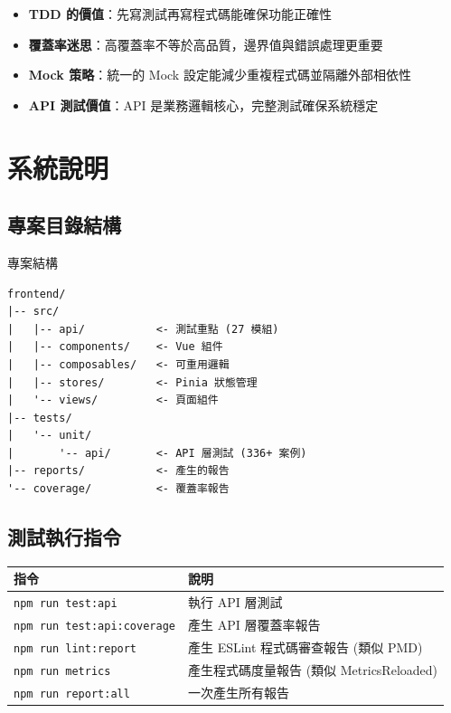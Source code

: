 \documentclass[11pt, a4paper]{article}
\begin{document}
\begin{itemize}[label=\textcolor{ElectricCyan}{$\blacksquare$}]
  \item \textbf{TDD 的價值}：先寫測試再寫程式碼能確保功能正確性
  \item \textbf{覆蓋率迷思}：高覆蓋率不等於高品質，邊界值與錯誤處理更重要
  \item \textbf{Mock 策略}：統一的 Mock 設定能減少重複程式碼並隔離外部相依性
  \item \textbf{API 測試價值}：API 是業務邏輯核心，完整測試確保系統穩定
\end{itemize}

\newpage
\section{系統說明}

\subsection{專案目錄結構}

\begin{codebox}{專案結構}
  \begin{lstlisting}[language={}]
frontend/
|-- src/
|   |-- api/           <- 測試重點 (27 模組)
|   |-- components/    <- Vue 組件
|   |-- composables/   <- 可重用邏輯
|   |-- stores/        <- Pinia 狀態管理
|   '-- views/         <- 頁面組件
|-- tests/
|   '-- unit/
|       '-- api/       <- API 層測試 (336+ 案例)
|-- reports/           <- 產生的報告
'-- coverage/          <- 覆蓋率報告
\end{lstlisting}
\end{codebox}

\subsection{測試執行指令}

\begin{center}
  \renewcommand{\arraystretch}{1.4}
  \begin{tabular}{p{} p{}}
    \toprule
    \textbf{指令}                                             & \textbf{說明}                    \\
    \midrule
    \texttt{npm run test:api}                               & 執行 API 層測試                     \\
    \rowcolor{LightGray} \texttt{npm run test:api:coverage} & 產生 API 層覆蓋率報告                  \\
    \texttt{npm run lint:report}                            & 產生 ESLint 程式碼審查報告 (類似 PMD)     \\
    \rowcolor{LightGray} \texttt{npm run metrics}           & 產生程式碼度量報告 (類似 MetricsReloaded) \\
    \texttt{npm run report:all}                             & 一次產生所有報告                       \\
    \bottomrule
  \end{tabular}
\end{center}
\end{document}
